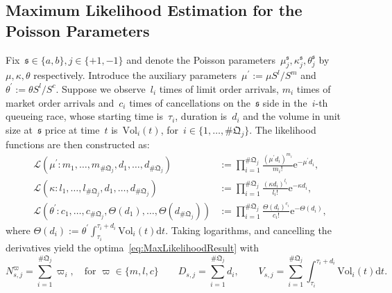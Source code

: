 \documentclass{amsart}[11pt]
\numberwithin{equation}{section}
\theoremstyle{definition}
\newcommand{\D}{\mathrm{d}}
\newcommand{\E}{\mathrm{e}}
\newcommand{\ssf}{\mathfrak{s}}
\newcommand{\Qf}{\mathfrak{Q}}
\begin{document}
\begin{appendix}
\section{Maximum Likelihood Estimation for the Poisson Parameters}\label{App:MLE}
Fix~$\ssf\in\{a, b\}, j\in\{+1, -1\}$ and 
denote the Poisson parameters~$\mu_j^\ssf, \kappa_j^\ssf, \theta_j^\ssf$
by~$\mu, \kappa, \theta$ respectively.
Introduce the auxiliary parameters~$\mu^\prime := \mu S^l/S^m$
and~$\theta^\prime := \theta S^l/ S^c$.
Suppose we observe~$l_i$ times of limit order arrivals, 
$m_i$ times of market order arrivals and~$c_i$ times of cancellations on the~$\ssf$ side in the~$i$-th queueing race,
whose starting time is~$\tau_i$,
duration is~$d_i$
and
the volume in unit size at~$\ssf$ price at time~$t$ is~$\text{Vol}_i(t)$,
for~$i \in \{1, \dots, \# \Qf_j\}$.
The likelihood functions are then constructed as:
\begin{align*}
\mathcal{L}\left(\mu^\prime: m_1, \dots, m_{\# \Qf_j}, d_1, \dots, d_{\# \Qf_j}\right)
&:=\prod_{i =1}^{\# \Qf_j}\frac{{(\mu^\prime d_i)}^{m_i}}{m_i !}\E^{-\mu^\prime d_i},\\
\mathcal{L}\left(\kappa: l_1, \dots, l_{\# \Qf_j}, d_1, \dots, d_{\# \Qf_j}\right)
&:=\prod_{i =1}^{\# \Qf_j}\frac{{(\kappa d_i)}^{l_i}}{l_i !}\E^{-\kappa d_i},\\
\mathcal{L}\left(\theta^\prime: c_1, \dots, c_{\# \Qf_j}, \Theta(d_1), \dots, \Theta(d_{\# \Qf_j})\right)
&:=\prod_{i =1}^{\# \Qf_j}\frac{{\Theta(d_i)}^{c_i}}{c_i !}\E^{-\Theta(d_i)},
\end{align*}
where $\Theta(d_i):=\theta^\prime \int_{\tau_i}^{\tau_i+d_i}\text{Vol}_i(t)\D t$.
Taking logarithms, and cancelling the derivatives yield the optima~\eqref{eq:MaxLikelihoodResult}
with
$$
N_{s,j}^{\varpi} = \sum_{i=1}^{\# \Qf_j}\varpi_i,\quad\text{for }\varpi\in \{m,l,c\}\qquad
D_{s,j} = \sum_{i=1}^{\# \Qf_j}d_i,\qquad
V_{s,j} = \sum_{i=1}^{\# \Qf_j}\int_{\tau_i}^{\tau_i+d_i}\text{Vol}_i(t)\D t.
$$
\end{appendix}


\end{document}
